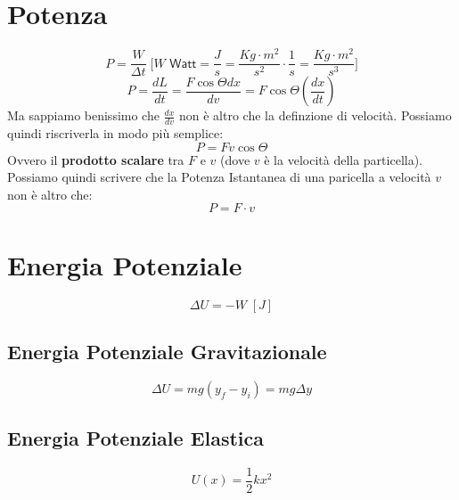     
    \section*{Potenza}
        \begin{equation*}
            P = \frac{W}{\Delta t} \; \Bigg[W \textsf{  Watt} = \frac{J}{s} 
            = \frac{Kg \cdot m^2}{s^2} \cdot \frac{1}{s} 
            = \frac{Kg \cdot m^2}{s^3} \Bigg]
        \end{equation*}
        \begin{equation*}
            P = \frac{dL}{dt} = \frac{F \cos \Theta dx}{dv} 
            = F \cos \Theta (\frac{dx}{dt})
        \end{equation*}
        Ma sappiamo benissimo che $\frac{dx}{dv}$ non è altro che la definzione 
        di velocità. Possiamo quindi riscriverla in modo più semplice:
        \begin{equation*}
            P = Fv\cos\Theta
        \end{equation*}
        Ovvero il \textbf{prodotto scalare} tra $F$ e $v$ (dove $v$ è la 
        velocità della particella). Possiamo quindi scrivere che la Potenza 
        Istantanea di una paricella a velocità $v$ non è altro che:
        \begin{equation*}
            P = F \cdot v
        \end{equation*}

    \section*{Energia Potenziale}
        \begin{equation*}
            \Delta U = - W \;[J]
        \end{equation*}

        \subsection*{Energia Potenziale Gravitazionale}
            \begin{equation*}
                \Delta U = mg(y_f - y_i) = mg \Delta y
            \end{equation*}

        \subsection*{Energia Potenziale Elastica}
            \begin{equation*}
                U(x)     = \frac{1}{2}kx^2
            \end{equation*}

